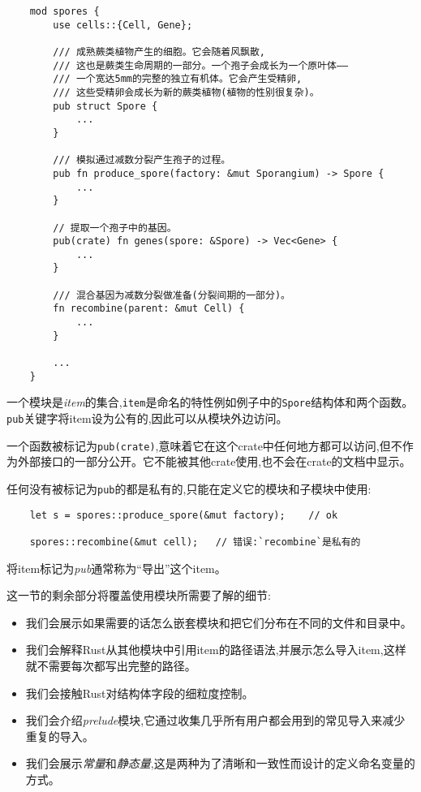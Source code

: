 \begin{verbatim}
    mod spores {
        use cells::{Cell, Gene};

        /// 成熟蕨类植物产生的细胞。它会随着风飘散,
        /// 这也是蕨类生命周期的一部分。一个孢子会成长为一个原叶体——
        /// 一个宽达5mm的完整的独立有机体。它会产生受精卵,
        /// 这些受精卵会成长为新的蕨类植物(植物的性别很复杂)。
        pub struct Spore {
            ...
        }

        /// 模拟通过减数分裂产生孢子的过程。
        pub fn produce_spore(factory: &mut Sporangium) -> Spore {
            ...
        }

        // 提取一个孢子中的基因。
        pub(crate) fn genes(spore: &Spore) -> Vec<Gene> {
            ...
        }

        /// 混合基因为减数分裂做准备(分裂间期的一部分)。
        fn recombine(parent: &mut Cell) {
            ...
        }

        ...
    }
\end{verbatim}

一个模块是\emph{item}的集合,\texttt{item}是命名的特性例如例子中的\texttt{Spore}结构体和两个函数。\texttt{pub}关键字将item设为公有的,因此可以从模块外边访问。

一个函数被标记为\texttt{pub(crate)},意味着它在这个crate中任何地方都可以访问,但不作为外部接口的一部分公开。它不能被其他crate使用,也不会在crate的文档中显示。

任何没有被标记为\texttt{pub}的都是私有的,只能在定义它的模块和子模块中使用:
\begin{verbatim}
    let s = spores::produce_spore(&mut factory);    // ok
    
    spores::recombine(&mut cell);   // 错误:`recombine`是私有的
\end{verbatim}

将item标记为\emph{pub}通常称为“导出”这个item。

这一节的剩余部分将覆盖使用模块所需要了解的细节:
\begin{itemize}
    \item 我们会展示如果需要的话怎么嵌套模块和把它们分布在不同的文件和目录中。
    \item 我们会解释Rust从其他模块中引用item的路径语法,并展示怎么导入item,这样就不需要每次都写出完整的路径。
    \item 我们会接触Rust对结构体字段的细粒度控制。
    \item 我们会介绍\emph{prelude}模块,它通过收集几乎所有用户都会用到的常见导入来减少重复的导入。
    \item 我们会展示\emph{常量}和\emph{静态量},这是两种为了清晰和一致性而设计的定义命名变量的方式。
\end{itemize}

